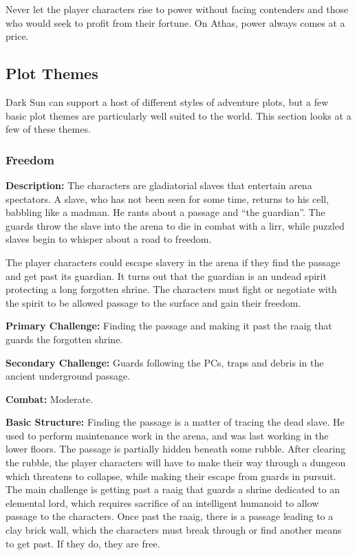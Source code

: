 Never let the player characters rise to power without facing contenders and those who would seek to profit from their fortune. On Athas, power always comes at a price.

\subsection{Plot Themes}
{\tableheader Dark Sun} can support a host of different styles of adventure plots, but a few basic plot themes are particularly well suited to the world. This section looks at a few of these themes.

\subsubsection{Freedom}

\textbf{Description:} The characters are gladiatorial slaves that entertain arena spectators. A slave, who has not been seen for some time, returns to his cell, babbling like a madman. He rants about a passage and ``the guardian''. The guards throw the slave into the arena to die in combat with a lirr, while puzzled slaves begin to whisper about a road to freedom.

The player characters could escape slavery in the arena if they find the passage and get past its guardian. It turns out that the guardian is an undead spirit protecting a long forgotten shrine. The characters must fight or negotiate with the spirit to be allowed passage to the surface and gain their freedom.

\textbf{Primary Challenge:} Finding the passage and making it past the raaig that guards the forgotten shrine.

\textbf{Secondary Challenge:} Guards following the PCs, traps and debris in the ancient underground passage.

\textbf{Combat:} Moderate.

\textbf{Basic Structure:} Finding the passage is a matter of tracing the dead slave. He used to perform maintenance work in the arena, and was last working in the lower floors. The passage is partially hidden beneath some rubble. After clearing the rubble, the player characters will have to make their way through a dungeon which threatens to collapse, while making their escape from guards in pursuit. The main challenge is getting past a raaig that guards a shrine dedicated to an elemental lord, which requires sacrifice of an intelligent humanoid to allow passage to the characters. Once past the raaig, there is a passage leading to a clay brick wall, which the characters must break through or find another means to get past. If they do, they are free.

